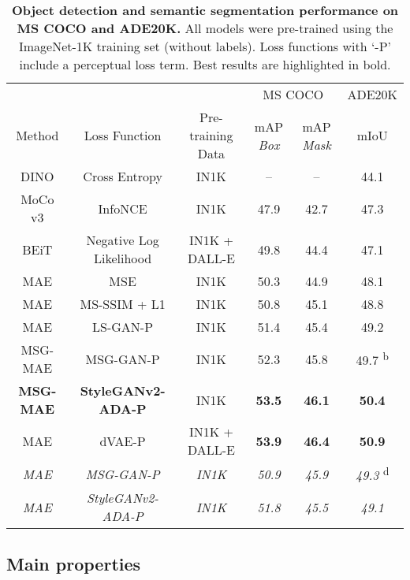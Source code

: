 \documentclass[10pt,twocolumn,letterpaper, cta-author]{article}
\begin{document}
\begin{table*}[h]
\caption{\textbf{Object detection and semantic segmentation performance on MS COCO and ADE20K.} All models were pre-trained using the ImageNet-1K training set (without labels). Loss functions with `-P' include a perceptual loss term. Best results are highlighted in bold.}
\begin{center}
 \begin{tabular}{c c c c c c} 
 \toprule
 \multicolumn{3}{c}{} & \multicolumn{2}{c}{MS COCO} & \multicolumn{1}{c}{ADE20K}\\
 Method & Loss Function & Pre-training Data & mAP \textit{Box} & mAP \textit{Mask} & mIoU\\ [0.5ex]
 \midrule
 DINO \cite{caron2021emerging}& Cross Entropy & IN1K & -- & -- & 44.1 \\
 MoCo v3 \cite{chen2021mocov3}& InfoNCE \cite{Oord2018RepresentationLW} & IN1K & 47.9 & 42.7 & 47.3 \\
 \addlinespace
 BEiT \cite{bao2022beit}& Negative Log Likelihood & IN1K + DALL-E & 49.8 & 44.4 & 47.1 \\
 MAE \cite{MaskedAutoencoders2021} & MSE & IN1K & 50.3 & 44.9 & 48.1 \\
 MAE & MS-SSIM + L1 & IN1K & 50.8 & 45.1 & 48.8 \\
 MAE & LS-GAN-P & IN1K & 51.4 & 45.4 & 49.2 \\
 \addlinespace
 MSG-MAE & MSG-GAN-P & IN1K & 52.3 & 45.8 & \hspace{0.5em}49.7\textsuperscript{ b} \\
 \textbf{MSG-MAE} & \textbf{StyleGANv2-ADA-P} & IN1K & \textbf{53.5} & \textbf{46.1} & \textbf{50.4} \\
 \midrule
 {MAE} & {dVAE-P} & {IN1K + DALL-E} &  {\textbf{53.9}} & {\textbf{46.4}} & {\textbf{50.9}} \\
 \midrule
 \textit{MAE} & \textit{MSG-GAN-P} & \textit{IN1K} & \textit{50.9} & \textit{45.9} & \hspace{0.5em}\textit{49.3}\textsuperscript{ d} \\
 \textit{MAE} & \textit{StyleGANv2-ADA-P} & \textit{IN1K} & \textit{51.8} & \textit{45.5} & \textit{49.1} \\
\bottomrule
\end{tabular}
\end{center}
\label{tab:coco_ade20k}
\end{table*}

\subsection{Main properties}
\label{main_properties}
\end{document}
